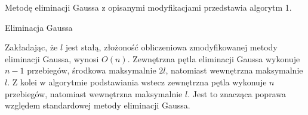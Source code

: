 \documentclass[12pt]{article}
\begin{document}
Metodę eliminacji Gaussa z opisanymi modyfikacjami przedstawia algorytm 1.

\begin{algorithm}[!htbp]
    			

\caption{Eliminacja Gaussa}
\end{algorithm} 
Zakładając, że $l$ jest stałą, złożoność obliczeniowa zmodyfikowanej metody eliminacji Gaussa, wynosi $O(n)$. Zewnętrzna pętla eliminacji Gaussa wykonuje $n-1$ przebiegów, środkowa maksymalnie $2l$, natomiast wewnętrzna maksymalnie $l$. Z kolei w algorytmie podstawiania wstecz zewnętrzna pętla wykonuje $n$ przebiegów, natomiast wewnętrzna maksymalnie $l$. Jest to znacząca poprawa względem standardowej metody eliminacji Gaussa. \\ 
\end{document}
